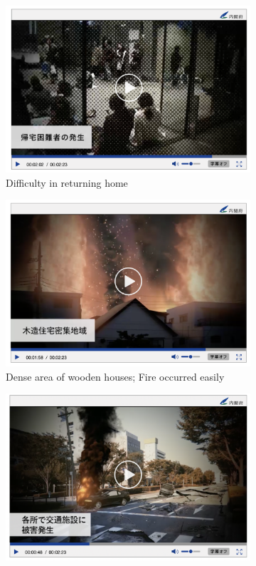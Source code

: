 \begin{figure}[h]
  \begin{subfigure}{0.32\textwidth}
    \centering
    \includegraphics[width=\textwidth]{Figure/Figure5a.jpg}
    \caption{Difficulty in returning home}
    \label{fig5a}
  \end{subfigure}\hfill
  \begin{subfigure}{0.32\textwidth}
    \centering
    \includegraphics[width=\linewidth]{Figure/Figure5b.jpg}
    \caption{Dense area of wooden houses; Fire occurred easily}
    \label{fig5b}
  \end{subfigure}\hfill
  \begin{subfigure}{0.32\textwidth}
    \centering
    \includegraphics[width=\linewidth]{Figure/Figure5c.jpg}

\end{subfigure}
\end{figure}
